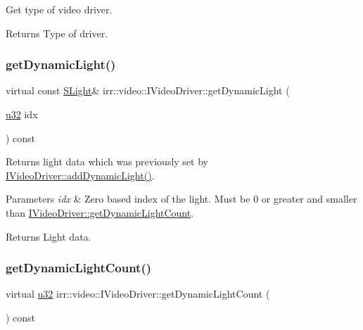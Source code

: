 Get type of video driver. 

\begin{DoxyReturn}{Returns}
Type of driver. 
\end{DoxyReturn}
\mbox{\label{classirr_1_1video_1_1IVideoDriver_a9eb9ee246e85a56300031f7d7516054e}} 
\subsubsection{\texorpdfstring{get\+Dynamic\+Light()}{getDynamicLight()}}
{\footnotesize\ttfamily virtual const \hyperlink{structirr_1_1video_1_1SLight}{S\+Light}\& irr\+::video\+::\+I\+Video\+Driver\+::get\+Dynamic\+Light (\begin{DoxyParamCaption}\item[{\hyperlink{namespaceirr_a0416a53257075833e7002efd0a18e804}{u32}}]{idx }\end{DoxyParamCaption}) const\hspace{0.3cm}{\ttfamily [pure virtual]}}



Returns light data which was previously set by \hyperlink{classirr_1_1video_1_1IVideoDriver_a813a39352eae26c4d30b5882618639be}{I\+Video\+Driver\+::add\+Dynamic\+Light()}. 


\begin{DoxyParams}{Parameters}
{\em idx} & Zero based index of the light. Must be 0 or greater and smaller than \hyperlink{classirr_1_1video_1_1IVideoDriver_a9b1e5de698f264a9f74a17bdba313138}{I\+Video\+Driver\+::get\+Dynamic\+Light\+Count}. \\
\hline
\end{DoxyParams}
\begin{DoxyReturn}{Returns}
Light data. 
\end{DoxyReturn}
\mbox{\label{classirr_1_1video_1_1IVideoDriver_a9b1e5de698f264a9f74a17bdba313138}} 
\subsubsection{\texorpdfstring{get\+Dynamic\+Light\+Count()}{getDynamicLightCount()}}
{\footnotesize\ttfamily virtual \hyperlink{namespaceirr_a0416a53257075833e7002efd0a18e804}{u32} irr\+::video\+::\+I\+Video\+Driver\+::get\+Dynamic\+Light\+Count (\begin{DoxyParamCaption}{ }\end{DoxyParamCaption}) const\hspace{0.3cm}{\ttfamily [pure virtual]}}



